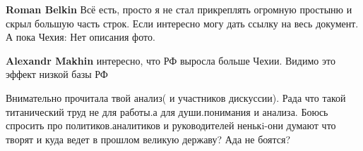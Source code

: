 \begin{itemize}
\begin{itemize}
\textbf{Roman Belkin}
Всё есть, просто я не стал прикреплять огромную простыню и скрыл большую часть строк. Если интересно могу дать ссылку на весь документ. А пока Чехия:
Нет описания фото.

 
\textbf{Alexandr Makhin} интересно, что РФ выросла больше Чехии.
Видимо это эффект низкой базы РФ
\end{itemize}

 

Внимательно прочитала твой анализ( и участников дискуссии). Рада что такой
титанический труд не для работы.а для души.понимания и анализа. Боюсь спросить
про политиков.аналитиков и руководителей ненькi-они думают что творят и куда
ведет в прошлом великую державу? Ада не боятся?


\end{itemize}

